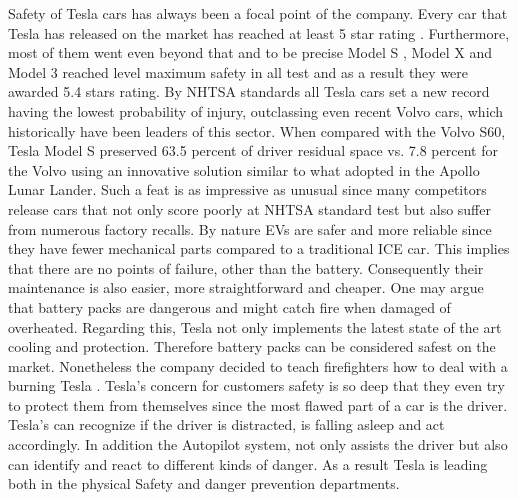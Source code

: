 \documentclass{article} %
\begin{document}
Safety of Tesla cars has always been a focal point of the company.
Every car that Tesla has released on the market has reached at least 5 star rating \cite{Safety}.%
Furthermore, most of them went even beyond that and to be precise Model S \cite{ModelS-Rating} , Model X and Model 3 reached level maximum safety in all test and as a result they were awarded 5.4 stars rating.%
By NHTSA standards all Tesla cars set a new record having the lowest probability of injury, outclassing even recent Volvo cars, which historically have been leaders of this sector. When compared with the Volvo S60, Tesla Model S preserved 63.5 percent of driver residual space vs. 7.8 percent for the Volvo using an innovative solution similar to what adopted in the Apollo Lunar Lander.%
Such a feat is as impressive as unusual since many competitors release cars that not only score poorly at NHTSA standard test but also suffer from  numerous factory recalls. 
\newline 
By nature EVs are safer and more reliable since they have fewer mechanical parts compared to a traditional ICE car. This implies that there are no points of failure, other than the battery.%
Consequently their maintenance is also easier, more straightforward and cheaper.%
\newline One may argue that battery packs are dangerous and might catch fire when damaged of overheated. Regarding this, Tesla not only implements the latest state of the art cooling and protection.%
Therefore battery packs can be considered safest on the market.%
Nonetheless the company decided to teach firefighters how to deal with a burning Tesla \cite{Tesla Training Fire}.%
\newline Tesla's concern for customers safety is so deep that they even try to protect them from themselves since the most flawed part of a car is the driver.%
\newline Tesla's can recognize if the driver is distracted, is falling asleep and act accordingly.%
In addition the Autopilot system,  not only assists the driver but also can identify and react to different kinds of danger. %
\newline As a result Tesla is leading both in the physical Safety and danger prevention departments.
\end{document}
